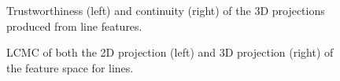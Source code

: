 \begin{figure}[H]
	\centering
	\caption{Trustworthiness (left) and continuity (right) of the 3D projections produced from line features.}\label{fig:TC_3d_lines}
\end{figure}

\begin{figure}[H]
	\centering
	\caption{LCMC of both the 2D projection (left) and 3D projection (right) of the feature space for lines.}\label{fig:LCMC_lines}
\end{figure}
\clearpage


